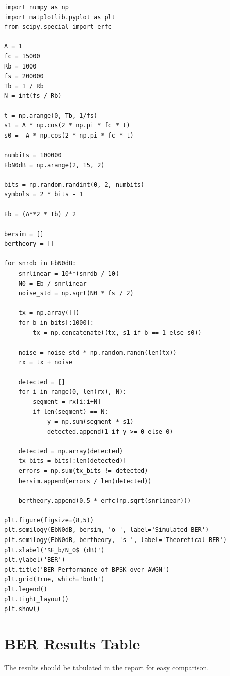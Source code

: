 \begin{lstlisting}[style=pythonstyle, caption={BER Simulation and Theoretical Calculation for BPSK}]
import numpy as np
import matplotlib.pyplot as plt
from scipy.special import erfc

A = 1
fc = 15000
Rb = 1000
fs = 200000
Tb = 1 / Rb
N = int(fs / Rb)

t = np.arange(0, Tb, 1/fs)
s1 = A * np.cos(2 * np.pi * fc * t)
s0 = -A * np.cos(2 * np.pi * fc * t)

numbits = 100000
EbN0dB = np.arange(2, 15, 2)

bits = np.random.randint(0, 2, numbits)
symbols = 2 * bits - 1

Eb = (A**2 * Tb) / 2

bersim = []
bertheory = []

for snrdb in EbN0dB:
    snrlinear = 10**(snrdb / 10)
    N0 = Eb / snrlinear
    noise_std = np.sqrt(N0 * fs / 2)

    tx = np.array([])
    for b in bits[:1000]:
        tx = np.concatenate((tx, s1 if b == 1 else s0))

    noise = noise_std * np.random.randn(len(tx))
    rx = tx + noise

    detected = []
    for i in range(0, len(rx), N):
        segment = rx[i:i+N]
        if len(segment) == N:
            y = np.sum(segment * s1)
            detected.append(1 if y >= 0 else 0)

    detected = np.array(detected)
    tx_bits = bits[:len(detected)]
    errors = np.sum(tx_bits != detected)
    bersim.append(errors / len(detected))

    bertheory.append(0.5 * erfc(np.sqrt(snrlinear)))

plt.figure(figsize=(8,5))
plt.semilogy(EbN0dB, bersim, 'o-', label='Simulated BER')
plt.semilogy(EbN0dB, bertheory, 's-', label='Theoretical BER')
plt.xlabel('$E_b/N_0$ (dB)')
plt.ylabel('BER')
plt.title('BER Performance of BPSK over AWGN')
plt.grid(True, which='both')
plt.legend()
plt.tight_layout()
plt.show()
\end{lstlisting}
\clearpage

\section{BER Results Table}
The results should be tabulated in the report for easy comparison.

